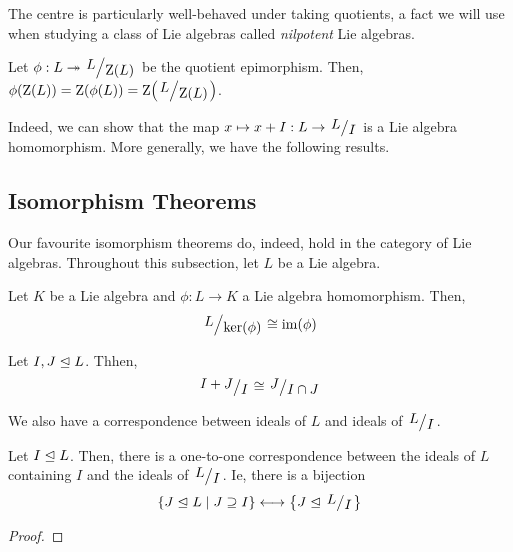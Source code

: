 
The centre is particularly well-behaved under taking quotients, a fact we will use when studying a class of Lie algebras called \textit{nilpotent} Lie algebras.

\begin{boxproposition}
    Let $\phi : L \surj \quotient{L}{\Zof{L}}$ be the quotient epimorphism. Then, $\phiof{\Zof{L}} = \Zof{\phiof{L}} = \Zof{\quotient{L}{\Zof{L}}}$.
\end{boxproposition}

Indeed, we can show that the map $x \mapsto x + I : L \to \quotient{L}{I}$ is a Lie algebra homomorphism. More generally, we have the following results. %

\subsection{Isomorphism Theorems}

Our favourite isomorphism theorems do, indeed, hold in the category of Lie algebras. Throughout this subsection, let $L$ be a Lie algebra.

\begin{boxtheorem}\label{SP:Thm:FirstIso}
    Let $K$ be a Lie algebra and $\phi : L \to K$ a Lie algebra homomorphism. Then,
    \begin{align}
        \quotient{L}{\pker{\phi}} \cong \pim{\phi}
        \label{SP:Eq:FirstIsomorphism}
    \end{align}
\end{boxtheorem}

\begin{boxtheorem}\label{SP:Thm:SecondIso}
    Let $I, J \trianglelefteq L$. Thhen,
    \begin{align}
        \quotient{I + J}{I} \cong \quotient{J}{I \cap J}
        \label{SP:Eq:SecondIsomorphism}
    \end{align}
\end{boxtheorem}


We also have a correspondence between ideals of $L$ and ideals of $\quotient{L}{I}$.

\begin{boxtheorem}\label{SP:Thm:Correspondence}
    Let $I \trianglelefteq L$. Then, there is a one-to-one correspondence between the ideals of $L$ containing $I$ and the ideals of $\quotient{L}{I}$. Ie, there is a bijection
    \begin{align}
        \setst{J \nsg L}{J \supseteq I}
        \longleftrightarrow
        \set{J \nsg \quotient{L}{I}}
    \end{align}
    \label{SP:Eq:Correspondence}
\end{boxtheorem}
\begin{proof}
    
\end{proof}

